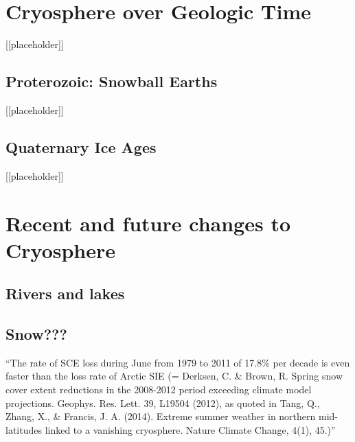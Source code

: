 
\section{Cryosphere over Geologic Time}  \label{Snow-ball Earth}
[[placeholder]]
\subsection{Proterozoic: Snowball Earths}
[[placeholder]]
\subsection{Quaternary Ice Ages}
[[placeholder]]

\section{Recent and future changes to Cryosphere}  \label{Our Rapidly Changing Cryosphere}
\subsection{Rivers and lakes}
\subsection{Snow???}
``The rate of SCE loss during June from 1979 to 2011 of 17.8\% per decade is even faster than the loss rate of Arctic SIE (= Derksen, C. \& Brown, R. Spring snow cover extent reductions in the 2008-2012 period exceeding climate model projections. Geophys. Res. Lett. 39, L19504 (2012), as quoted in Tang, Q., Zhang, X., \& Francis, J. A. (2014). Extreme summer weather in northern mid-latitudes linked to a vanishing cryosphere. Nature Climate Change, 4(1), 45.)''

